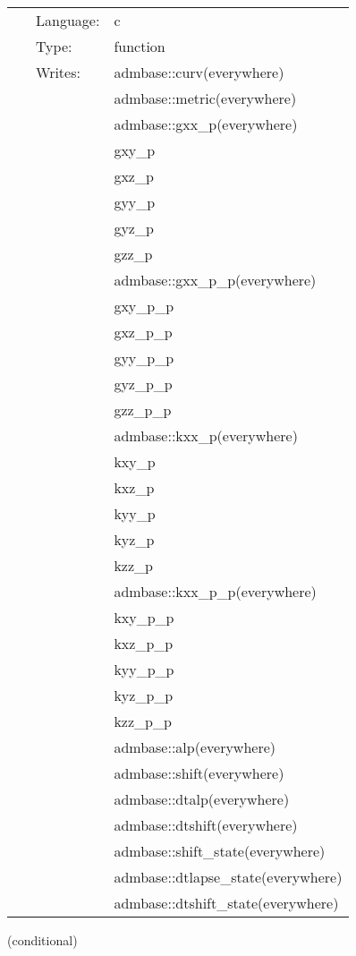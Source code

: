  \begin{tabular*}{160mm}{cll} 
~ & Language:  & c \\ 
~ & Type:  & function \\ 
~ & Writes:  & admbase::curv(everywhere) \\ 
~& ~ &admbase::metric(everywhere)\\ 
~& ~ &admbase::gxx\_p(everywhere)\\ 
~& ~ &gxy\_p\\ 
~& ~ &gxz\_p\\ 
~& ~ &gyy\_p\\ 
~& ~ &gyz\_p\\ 
~& ~ &gzz\_p\\ 
~& ~ &admbase::gxx\_p\_p(everywhere)\\ 
~& ~ &gxy\_p\_p\\ 
~& ~ &gxz\_p\_p\\ 
~& ~ &gyy\_p\_p\\ 
~& ~ &gyz\_p\_p\\ 
~& ~ &gzz\_p\_p\\ 
~& ~ &admbase::kxx\_p(everywhere)\\ 
~& ~ &kxy\_p\\ 
~& ~ &kxz\_p\\ 
~& ~ &kyy\_p\\ 
~& ~ &kyz\_p\\ 
~& ~ &kzz\_p\\ 
~& ~ &admbase::kxx\_p\_p(everywhere)\\ 
~& ~ &kxy\_p\_p\\ 
~& ~ &kxz\_p\_p\\ 
~& ~ &kyy\_p\_p\\ 
~& ~ &kyz\_p\_p\\ 
~& ~ &kzz\_p\_p\\ 
~& ~ &admbase::alp(everywhere)\\ 
~& ~ &admbase::shift(everywhere)\\ 
~& ~ &admbase::dtalp(everywhere)\\ 
~& ~ &admbase::dtshift(everywhere)\\ 
~& ~ &admbase::shift\_state(everywhere)\\ 
~& ~ &admbase::dtlapse\_state(everywhere)\\ 
~& ~ &admbase::dtshift\_state(everywhere)\\ 
\end{tabular*} 


\vspace{5mm}

   (conditional) 

